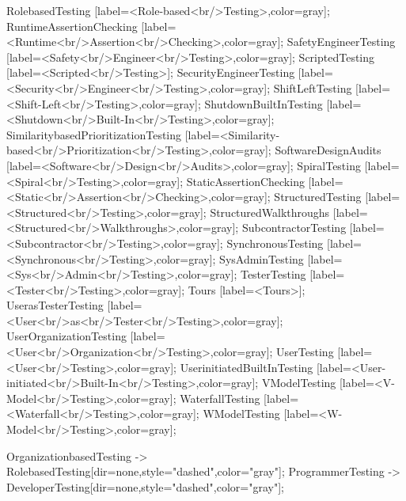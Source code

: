 \documentclass{article}
\begin{document}
{RolebasedTesting [label=<Role-based<br/>Testing>,color=gray];
RuntimeAssertionChecking [label=<Runtime<br/>Assertion<br/>Checking>,color=gray];
SafetyEngineerTesting [label=<Safety<br/>Engineer<br/>Testing>,color=gray];
ScriptedTesting [label=<Scripted<br/>Testing>];
SecurityEngineerTesting [label=<Security<br/>Engineer<br/>Testing>,color=gray];
ShiftLeftTesting [label=<Shift-Left<br/>Testing>,color=gray];
ShutdownBuiltInTesting [label=<Shutdown<br/>Built-In<br/>Testing>,color=gray];
SimilaritybasedPrioritizationTesting [label=<Similarity-based<br/>Prioritization<br/>Testing>,color=gray];
SoftwareDesignAudits [label=<Software<br/>Design<br/>Audits>,color=gray];
SpiralTesting [label=<Spiral<br/>Testing>,color=gray];
StaticAssertionChecking [label=<Static<br/>Assertion<br/>Checking>,color=gray];
StructuredTesting [label=<Structured<br/>Testing>,color=gray];
StructuredWalkthroughs [label=<Structured<br/>Walkthroughs>,color=gray];
SubcontractorTesting [label=<Subcontractor<br/>Testing>,color=gray];
SynchronousTesting [label=<Synchronous<br/>Testing>,color=gray];
SysAdminTesting [label=<Sys<br/>Admin<br/>Testing>,color=gray];
TesterTesting [label=<Tester<br/>Testing>,color=gray];
Tours [label=<Tours>];
UserasTesterTesting [label=<User<br/>as<br/>Tester<br/>Testing>,color=gray];
UserOrganizationTesting [label=<User<br/>Organization<br/>Testing>,color=gray];
UserTesting [label=<User<br/>Testing>,color=gray];
UserinitiatedBuiltInTesting [label=<User-initiated<br/>Built-In<br/>Testing>,color=gray];
VModelTesting [label=<V-Model<br/>Testing>,color=gray];
WaterfallTesting [label=<Waterfall<br/>Testing>,color=gray];
WModelTesting [label=<W-Model<br/>Testing>,color=gray];

OrganizationbasedTesting -> RolebasedTesting[dir=none,style="dashed",color="gray"];
ProgrammerTesting -> DeveloperTesting[dir=none,style="dashed",color="gray"];

}
\end{document}
